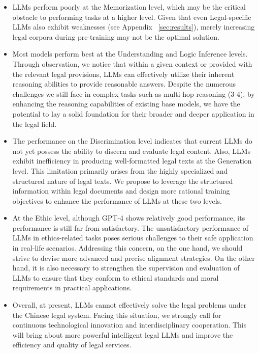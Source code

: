 \begin{itemize}[leftmargin=*]
    \item LLMs perform poorly at the Memorization level, which may be the critical obstacle to performing tasks at a higher level. Given that even Legal-specific LLMs also exhibit weaknesses (see Appendix ~\ref{sec:results}), merely increasing legal corpora during pre-training may not be the optimal solution.
    \item Most models perform best at the Understanding and Logic Inference levels. Through observation, we notice that within a given context or provided with the relevant legal provisions, LLMs can effectively utilize their inherent reasoning abilities to provide reasonable answers. Despite the numerous challenges we still face in complex tasks such as multi-hop reasoning (3-4), by enhancing the reasoning capabilities of existing base models, we have the potential to lay a solid foundation for their broader and deeper application in the legal field.
    \item The performance on the Discrimination level indicates that current LLMs do not yet possess the ability to discern and evaluate legal content. Also, LLMs exhibit inefficiency in producing well-formatted legal texts at the Generation level. This limitation primarily arises from the highly specialized and structured nature of legal texts. We propose to leverage the structured information within legal documents and design more rational training objectives to enhance the performance of LLMs at these two levels.
    \item At the Ethic level, although GPT-4 shows relatively good performance, its performance is still far from satisfactory.
    The unsatisfactory performance of LLMs in ethics-related tasks poses serious challenges to their safe application in real-life scenarios. Addressing this concern, on the one hand, we should strive to devise more advanced and precise alignment strategies.  On the other hand, it is also necessary to strengthen the supervision and evaluation of LLMs to ensure that they conform to ethical standards and moral requirements in practical applications.
    \item Overall, at present, LLMs cannot effectively solve the legal problems under the Chinese legal system. Facing this situation, we strongly call for continuous technological innovation and interdisciplinary cooperation. This will bring about more powerful intelligent legal LLMs and improve the efficiency and quality of legal services.
\end{itemize}

